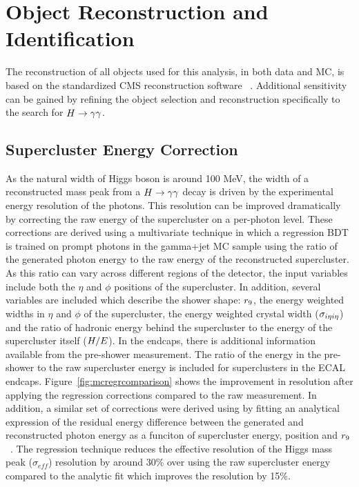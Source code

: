 \section{Object Reconstruction and Identification}
\label{sec:objectrecoandid}

The reconstruction of all objects used for this analysis, in both data and MC,
is based on the standardized CMS reconstruction software \texttt{\cmssw}~\cite{null}. 
Additional sensitivity can be gained by refining the object selection and reconstruction specifically
to the search for $H\rightarrow\gamma\gamma$.

\subsection{Supercluster Energy Correction}
\label{superclusterenergyreconstruction}

As the natural width of Higgs boson is around 100 MeV, the width of a reconstructed mass peak from 
a $H\rightarrow\gamma\gamma$ decay is driven by the experimental energy resolution of the photons.
This resolution can be improved dramatically by correcting the raw energy of the supercluster 
on a per-photon level. These corrections are derived using a multivariate technique 
in which a regression BDT is trained on prompt photons in the gamma+jet MC sample using the 
ratio of the generated photon energy to the raw energy of the reconstructed supercluster.
As this ratio can vary across different regions of the detector, the input variables include both the 
$\eta$ and $\phi$ positions of the supercluster. In addition, several variables are included which 
describe the shower shape: $r_{9}$, the energy weighted widths in $\eta$ and $\phi$ of the supercluster,
the energy weighted crystal width ($\sigma_{i\eta i\eta}$) and the ratio of hadronic energy behind the supercluster
to the energy of the supercluster itself ($H/E$). In the endcaps, there is additional information 
available from the pre-shower measurement. The ratio of the energy in the pre-shower to the raw supercluster energy
is included for superclusters in the ECAL endcaps. Figure~\ref{fig:mcregrcomparison} shows the improvement
in resolution after applying the regression corrections compared to the raw measurement.
In addition, a similar set of corrections were derived using by fitting an analytical expression 
of the residual energy difference between the 
generated and reconstructed photon energy as a funciton of supercluster energy, position and $r_{9}$~\cite{AN-11-343}. 
The regression technique reduces the effective resolution of the Higgs mass peak ($\sigma_{eff}$) 
resolution by around 30\% over using the raw supercluster energy compared to the analytic fit which
improves the resolution by 15\%. 

